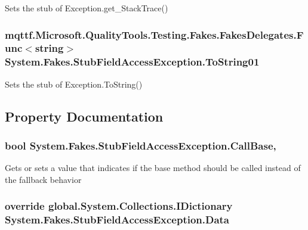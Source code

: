 Sets the stub of Exception.\-get\-\_\-\-Stack\-Trace()

\hypertarget{class_system_1_1_fakes_1_1_stub_field_access_exception_adf89dd93721eb7f1c9662cb3439eb1c2}{
\subsubsection[{To\-String01}]{\setlength{\rightskip}{0pt plus 5cm}mqttf.\-Microsoft.\-Quality\-Tools.\-Testing.\-Fakes.\-Fakes\-Delegates.\-Func$<$string$>$ System.\-Fakes.\-Stub\-Field\-Access\-Exception.\-To\-String01}}\label{class_system_1_1_fakes_1_1_stub_field_access_exception_adf89dd93721eb7f1c9662cb3439eb1c2}


Sets the stub of Exception.\-To\-String()



\subsection{Property Documentation}
\hypertarget{class_system_1_1_fakes_1_1_stub_field_access_exception_a6206160fde5697d441ef2772adc4e399}{
\subsubsection[{Call\-Base}]{\setlength{\rightskip}{0pt plus 5cm}bool System.\-Fakes.\-Stub\-Field\-Access\-Exception.\-Call\-Base\hspace{0.3cm}{\ttfamily [get]}, {\ttfamily [set]}}}\label{class_system_1_1_fakes_1_1_stub_field_access_exception_a6206160fde5697d441ef2772adc4e399}


Gets or sets a value that indicates if the base method should be called instead of the fallback behavior

\hypertarget{class_system_1_1_fakes_1_1_stub_field_access_exception_a13d3a7344bbd89386e3318e4cc0afc56}{
\subsubsection[{Data}]{\setlength{\rightskip}{0pt plus 5cm}override global.\-System.\-Collections.\-I\-Dictionary System.\-Fakes.\-Stub\-Field\-Access\-Exception.\-Data\hspace{0.3cm}{\ttfamily [get]}}}\label{class_system_1_1_fakes_1_1_stub_field_access_exception_a13d3a7344bbd89386e3318e4cc0afc56}


